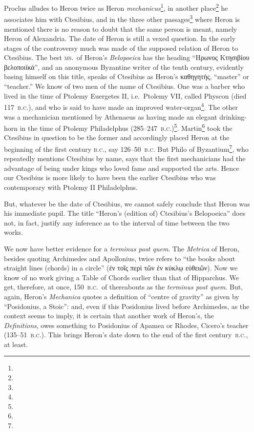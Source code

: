 Proclus alludes to Heron twice as Heron \emph{mechanicus}\footnote{}, in another place\footnote{} he associates him with Ctesibius, and in the three other passages\footnote{} where Heron is mentioned there is no reason to doubt that the same person is meant, namely Heron of Alexandria. The date of Heron is still a vexed question. In the early stages of the controversy much was made of the supposed relation of Heron to Ctesibius. The best \textsc{ms.}\ of Heron's \emph{Belopoeica} has the heading ``Ηρωνος Κτησιβίου βελοποιϊκά'', and an anonymous Byzantine writer of the tenth century, evidently basing himself on this title, speaks of Ctesibius as Heron's καθηγητής, ``master'' or ``teacher.'' We know of two men of the name of Ctesibius. One was a barber who lived in the time of Ptolemy Euergetes II, i.e.\ Ptolemy VII, called Physcon (died 117~\textsc{b.c.}), and who is said to have made an improved water-organ\footnote{}. The other was a mechanician mentioned by Athenaeus as having made an elegant drinking-horn in the time of Ptolemy Philadelphus (285--247~\textsc{b.c.})\footnote{}. Martin\footnote{} took the Ctesibius in question to be the former and accordingly placed Heron at the beginning of the first century \textsc{b.c.}, say 126--50~\textsc{b.c.} But Philo of Byzantium\footnote{}, who repeatedly mentions Ctesibius by name, says that the first mechanicians had the advantage of being under kings who loved fame and supported the arts. Hence our Ctesibius is more likely to have been the earlier Ctesibius who was contemporary with Ptolemy II Philadelphus.

But, whatever be the date of Ctesibius, we cannot safely conclude that Heron was his immediate pupil. The title ``Heron's (edition of) Ctesibius's Belopoeica'' does not, in fact, justify any inference as to the interval of time between the two works.

We now have better evidence for a \emph{terminus post quem}. The \emph{Metrica} of Heron, besides quoting Archimedes and Apollonius, twice refers to ``the books about straight lines (chords) in a circle'' (ἐν τοῖς περὶ τῶν ἐν κύκλῳ εὐθειῶν). Now we know of no work giving a Table of Chords earlier than that of Hipparchus. We get, therefore, at once, 150~\textsc{b.c.}\ of thereabouts as the \emph{terminus post quem}. But, again, Heron's \emph{Mechanica} quotes a definition of ``centre of gravity'' as given by ``Posidonius, a Stoic'': and, even if this Posidonius lived before Archimedes, as the context seems to imply, it is certain that another work of Heron's, the \emph{Definitions}, owes something to Posidonius of Apamea or Rhodes, Cicero's teacher (135--51~\textsc{b.c.}). This brings Heron's date down to the end of the first century~\textsc{b.c.}, at least.

